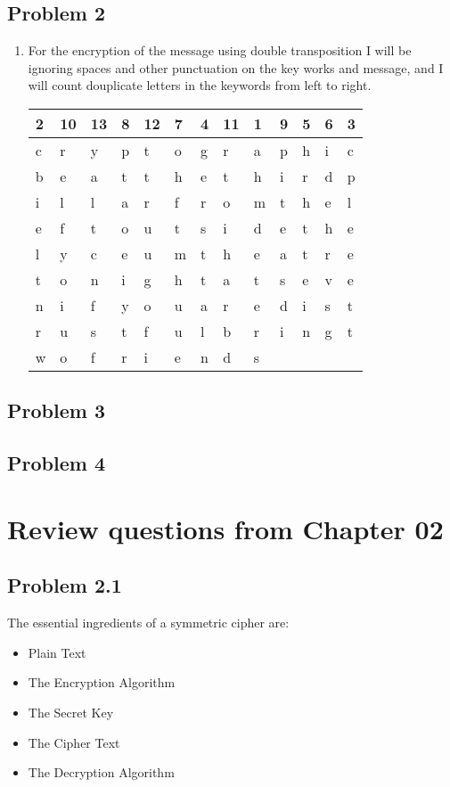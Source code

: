 \documentclass[14pt]{article}
\begin{document}
\subsection{Problem  2}
\begin{enumerate}[label=(\alph*)]
\item For the encryption of the message using double transposition I will be ignoring spaces and other punctuation on the key works and message, and I will count douplicate letters in the keywords from left to right. 
\newline
\begin{tabular}{ l l l l l l l l l l l l l }
2 & 10 & 13 & 8 & 12 & 7 & 4 & 11 & 1 & 9 & 5 & 6 & 3\\
\hline
c & r & y & p & t & o & g & r & a & p & h & i & c\\
\hline
b & e & a & t & t & h & e & t & h & i & r & d & p\\
i & l & l & a & r & f & r & o & m & t & h & e & l\\
e & f & t & o & u & t & s & i & d & e & t & h & e\\
l & y & c & e & u & m & t & h & e & a & t & r & e\\
t & o & n & i & g & h & t & a & t & s & e & v & e\\
n & i & f & y & o & u & a & r & e & d & i & s & t\\
r & u & s & t & f & u & l & b & r & i & n & g & t\\
w & o & f & r & i & e & n & d & s\\
\end{tabular}
\end{enumerate}

\subsection{Problem  3}


\subsection{Problem  4}



\newpage


\section{Review questions from Chapter 02}

\subsection{Problem  2.1}
The essential ingredients of a symmetric cipher are:
\begin{itemize}
\item Plain Text
\item The Encryption Algorithm
\item The Secret Key
\item The Cipher Text
\item The Decryption Algorithm
\end{itemize}
\end{document}
